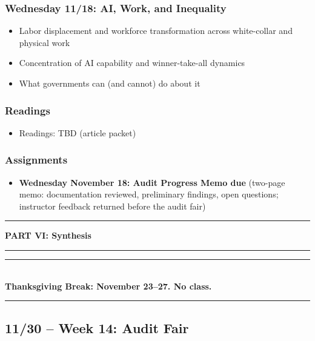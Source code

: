 \documentclass[12pt]{article}
\begin{document}
    \subsubsection*{Wednesday 11/18: AI, Work, and Inequality}
        \begin{itemize}
            \item Labor displacement and workforce transformation across white-collar and physical work
            \item Concentration of AI capability and winner-take-all dynamics
            \item What governments can (and cannot) do about it
        \end{itemize}
    \subsubsection*{Readings}
        \begin{itemize}
            \item Readings: TBD (article packet)
        \end{itemize}
    \subsubsection*{Assignments}
        \begin{itemize}
            \item \textbf{Wednesday November 18: Audit Progress Memo due} (two-page memo: documentation reviewed, preliminary findings, open questions; instructor feedback returned before the audit fair)
        \end{itemize}

\bigskip
\noindent\rule{\textwidth}{0.6pt}
\begin{center}\textbf{PART VI: Synthesis}\end{center}
\noindent\rule{\textwidth}{0.6pt}

\begin{center}
\vspace{0.5em}
\noindent\rule{0.5\textwidth}{0.4pt}\\[0.25em]
\textbf{Thanksgiving Break: November 23--27. No class.}\\[0.25em]
\noindent\rule{0.5\textwidth}{0.4pt}
\vspace{0.5em}
\end{center}

\subsection*{11/30 -- Week 14: Audit Fair}
\end{document}
